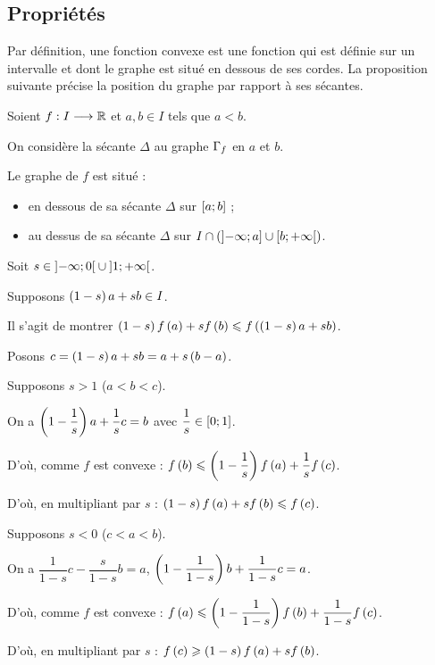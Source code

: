 \subsection{Propriétés}

Par définition, une fonction convexe est une fonction qui est définie sur un intervalle et dont le graphe est situé en dessous de ses cordes. La proposition suivante précise la position du graphe par rapport à ses sécantes.

\begin{prop}
Soient \(f:I\longrightarrow\mathbb{R}\) et \(a,b\in I\) tels que \(a<b\).

On considère la sécante \(\Delta\) au graphe \(\Gamma_{f}\) en \(a\) et \(b\).

Le graphe de \(f\) est situé :

\begin{itemize}
\item en dessous de sa sécante \(\Delta\) sur \(\left[a;b\right]\) ; \\

\item au dessus de sa sécante \(\Delta\) sur \(I\cap\left(\left]-\infty;a\right]\cup\left[b;+\infty\right[\right)\).
\end{itemize}
\end{prop}

\begin{dem}
Soit \(s\in\left]-\infty;0\right[\cup\left]1;+\infty\right[\).

Supposons \(\left(1-s\right)a+sb\in I\).

Il s'agit de montrer \(\left(1-s\right)f\left(a\right)+sf\left(b\right)\leqslant f\left(\left(1-s\right)a+sb\right)\).

Posons \(c=\left(1-s\right)a+sb=a+s\left(b-a\right)\).

Supposons \(s>1\) (\cad \(a<b<c\)).

On a \(\left(1-\dfrac{1}{s}\right)a+\dfrac{1}{s}c=b\) avec \(\dfrac{1}{s}\in\left[0;1\right]\).

D'où, comme \(f\) est convexe : \(f\left(b\right)\leqslant\left(1-\dfrac{1}{s}\right)f\left(a\right)+\dfrac{1}{s}f\left(c\right)\).

D'où, en multipliant par \(s\) : \(\left(1-s\right)f\left(a\right)+sf\left(b\right)\leqslant f\left(c\right)\).

Supposons \(s<0\) (\cad \(c<a<b\)).

On a \(\dfrac{1}{1-s}c-\dfrac{s}{1-s}b=a\), \cad \(\left(1-\dfrac{1}{1-s}\right)b+\dfrac{1}{1-s}c=a\).

D'où, comme \(f\) est convexe : \(f\left(a\right)\leqslant\left(1-\dfrac{1}{1-s}\right)f\left(b\right)+\dfrac{1}{1-s}f\left(c\right)\).

D'où, en multipliant par \(s\) : \(f\left(c\right)\geqslant\left(1-s\right)f\left(a\right)+sf\left(b\right)\).
\end{dem}


